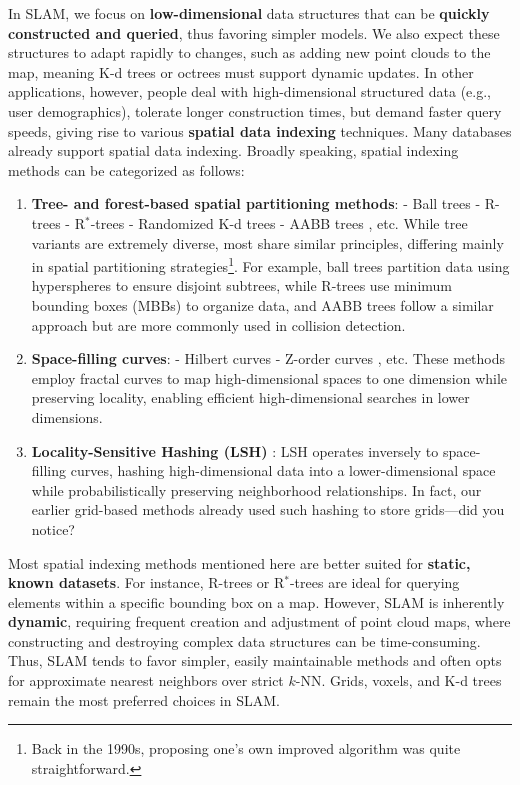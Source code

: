 In SLAM, we focus on \textbf{low-dimensional} data structures that can be \textbf{quickly constructed and queried}, thus favoring simpler models. We also expect these structures to adapt rapidly to changes, such as adding new point clouds to the map, meaning K-d trees or octrees must support dynamic updates. In other applications, however, people deal with high-dimensional structured data (e.g., user demographics), tolerate longer construction times, but demand faster query speeds, giving rise to various \textbf{spatial data indexing} techniques. Many databases already support spatial data indexing. Broadly speaking, spatial indexing methods can be categorized as follows:

\begin{enumerate}
	\item \textbf{Tree- and forest-based spatial partitioning methods}:  
	- Ball trees \cite{Omohundro1989, Dolatshah2015, Liu2006}  
	- R-trees \cite{Guttman1984}  
	- R$^*$-trees \cite{Beckmann1990}  
	- Randomized K-d trees \cite{Duch1998}  
	- AABB trees \cite{Bergen1997}, etc.  
	While tree variants are extremely diverse, most share similar principles, differing mainly in spatial partitioning strategies\footnote{Back in the 1990s, proposing one's own improved algorithm was quite straightforward.}. For example, ball trees partition data using hyperspheres to ensure disjoint subtrees, while R-trees use minimum bounding boxes (MBBs) to organize data, and AABB trees follow a similar approach but are more commonly used in collision detection.
	
	\item \textbf{Space-filling curves}:  
	- Hilbert curves \cite{Lawder2001, Khoshgozaran2007}  
	- Z-order curves \cite{Orenstein1988}, etc.  
	These methods employ fractal curves to map high-dimensional spaces to one dimension while preserving locality, enabling efficient high-dimensional searches in lower dimensions.
	
	\item \textbf{Locality-Sensitive Hashing (LSH)} \cite{Datar2004, Teschner2003}:  
	LSH operates inversely to space-filling curves, hashing high-dimensional data into a lower-dimensional space while probabilistically preserving neighborhood relationships. In fact, our earlier grid-based methods already used such hashing to store grids—did you notice?
\end{enumerate}

Most spatial indexing methods mentioned here are better suited for \textbf{static, known datasets}. For instance, R-trees or R$^*$-trees are ideal for querying elements within a specific bounding box on a map. However, SLAM is inherently \textbf{dynamic}, requiring frequent creation and adjustment of point cloud maps, where constructing and destroying complex data structures can be time-consuming. Thus, SLAM tends to favor simpler, easily maintainable methods and often opts for approximate nearest neighbors over strict $k$-NN. Grids, voxels, and K-d trees remain the most preferred choices in SLAM.


